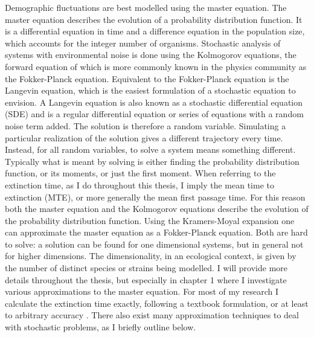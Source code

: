 Demographic fluctuations are best modelled using the master equation. 
The master equation describes the evolution of a probability distribution function. 
It is a differential equation in time and a difference equation in the population size, which accounts for the integer number of organisms. 
Stochastic analysis of systems with environmental noise is done using the Kolmogorov equations, the forward equation of which is more commonly known in the physics community as the Fokker-Planck equation. 
Equivalent to the Fokker-Planck equation is the Langevin equation, which is the easiest formulation of a stochastic equation to envision. 
A Langevin equation is also known as a stochastic differential equation (SDE) and is a regular differential equation or series of equations with a random noise term added. 
The solution is therefore a random variable. 
Simulating a particular realization of the solution gives a different trajectory every time. 
Instead, for all random variables, to solve a system means something different. 
Typically what is meant by solving is either finding the probability distribution function, or its moments, or just the first moment. 
When referring to the extinction time, as I do throughout this thesis, I imply the mean time to extinction (MTE), or more generally the mean first passage time. 
For this reason both the master equation and the Kolmogorov equations describe the evolution of the probability distribution function. 
Using the Kramers-Moyal expansion one can approximate the master equation as a Fokker-Planck equation. 
Both are hard to solve: a solution can be found for one dimensional systems, but in general not for higher dimensions. 
The dimensionality, in an ecological context, is given by the number of distinct species or strains being modelled. 
I will provide more details throughout the thesis, but especially in chapter 1 where I investigate various approximations to the master equation. %
For most of my research I calculate the extinction time exactly, following a textbook formulation, or at least to arbitrary accuracy \cite{Nisbet1982,Norden1982}. 
There also exist many approximation techniques to deal with stochastic problems, as I briefly outline below. %

